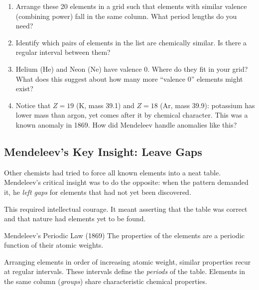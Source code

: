 \documentclass[12pt, a4paper]{book}
\newcommand{\newterm}[1]{\textit{\textcolor{DiscoveryColor}{#1}}}
\begin{document}
\begin{puzzlebox}
\begin{enumerate}[label=(\alph*), leftmargin=*]
  \item Arrange these 20 elements in a grid such that elements
        with similar valence (combining power) fall in the
        same column.
        What period lengths do you need?

  \item Identify which pairs of elements in the list
        are chemically similar.
        Is there a regular interval between them?

  \item Helium (He) and Neon (Ne) have valence 0.
        Where do they fit in your grid?
        What does this suggest about how many more
        ``valence 0'' elements might exist?

  \item Notice that $Z=19$ (K, mass 39.1) and $Z=18$ (Ar, mass 39.9):
        potassium has lower mass than argon, yet comes after it
        by chemical character.
        This was a known anomaly in 1869.
        How did Mendeleev handle anomalies like this?
\end{enumerate}
\end{puzzlebox}

\subsection{Mendeleev's Key Insight: Leave Gaps}

Other chemists had tried to force all known elements
into a neat table.
Mendeleev's critical insight was to do the opposite:
when the pattern demanded it, he \emph{left gaps}
for elements that had not yet been discovered.

This required intellectual courage.
It meant asserting that the table was correct
and that nature had elements yet to be found.

\begin{namedconcept}{Mendeleev's Periodic Law (1869)}
The properties of the elements are a periodic function
of their atomic weights.

Arranging elements in order of increasing atomic weight,
similar properties recur at regular intervals.
These intervals define the \newterm{periods} of the table.
Elements in the same column (\newterm{groups}) share
characteristic chemical properties.
\end{namedconcept}
\end{document}
